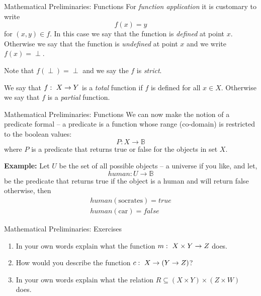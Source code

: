 \documentclass{beamer}
\begin{document}
\begin{frame}{\large Mathematical  Preliminaries: Functions}
For {\em function application} it is customary to write
\[
f(x) = y
\]
for $(x,y)\in f$.  In this case we say that the function is {\em defined} at point $x$.
Otherwise we say that the function is {\em undefined} at point $x$ and we write $f(x)=\perp$.

\vspace{.1in}

Note that $f(\perp) = \perp$  and we say the $f$ is {\em strict}.
\vspace{.1in}

We say that $f\,\colon\; X \rightarrow Y$ is a {\em total} function if $f$ is defined for all $x\in X$.
Otherwise we say that $f$ is a {\em partial} function.
\end{frame}

\begin{frame}{\large Mathematical  Preliminaries: Functions}
We can now make the notion of a predicate formal -- a predicate is a function whose range (co-domain) is restricted to the
boolean values:
\[
P: X \rightarrow {\mathbb B}
\]
where $P$ is a predicate that returns true or false for the objects in set $X$.

\vspace{.1in}

{\bf Example:} Let $U$ be the set of all possible objects -- a universe if you like, and let,
\[
\mathit{human}: U \rightarrow {\mathbb B}
\]
be the predicate that returns true if the object is a human and will return false otherwise, then
\begin{eqnarray*}
\mathit{human}(\mbox{socrates}) = \mathit{true}\\
\mathit{human}(\mbox{car}) = \mathit{false}
\end{eqnarray*}
\end{frame}


\begin{frame}{\large Mathematical  Preliminaries: Exercises}
\begin{enumerate}
\item In your own words explain what the function $m\,\colon\; X\times Y \rightarrow Z$ does.
\item How would you describe the function $c \,\colon\; X \rightarrow (Y \rightarrow Z)$?
\item In your own words explain what the relation $R \subseteq (X\times Y)\times (Z\times W)$ does.
\end{enumerate}
\end{frame}
\end{document}
